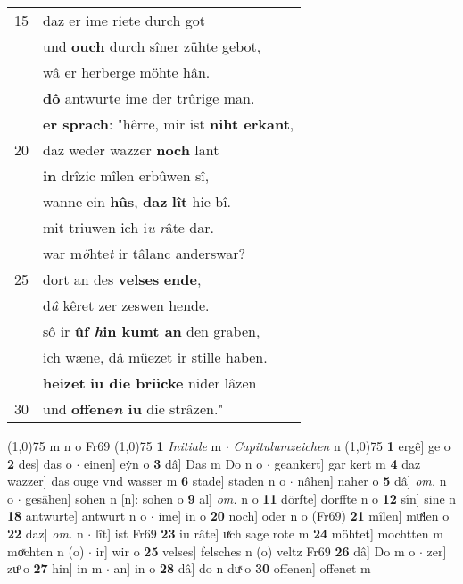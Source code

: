 \documentclass[8pt,a4paper,notitlepage]{article}
\begin{document}
\begin{table}[ht]
\begin{minipage}[t]{0.5\linewidth}
\begin{tabular}{rl}
15 & daz er ime riete durch got\\ 
 & und \textbf{ouch} durch sîner zühte gebot,\\ 
 & wâ er herberge möhte hân.\\ 
 & \textbf{dô} antwurte ime der trûrige man.\\ 
 & \textbf{er sprach}: "hêrre, mir ist \textbf{niht erkant},\\ 
20 & daz weder wazzer \textbf{noch} lant\\ 
 & \textbf{in} drîzic mîlen erbûwen sî,\\ 
 & wanne ein \textbf{hûs}, \textbf{daz} \textbf{lît} hie bî.\\ 
 & mit triuwen ich i\textit{u} \textit{r}âte dar.\\ 
 & war m\textit{ö}hte\textit{t} ir tâlanc anderswar?\\ 
25 & dort an des \textbf{velses} \textbf{ende},\\ 
 & d\textit{â} kêret zer zeswen hende.\\ 
 & sô ir \textbf{ûf \textit{h}in kumt an} den graben,\\ 
 & ich wæne, dâ müezet ir stille haben.\\ 
 & \textbf{heizet} \textbf{iu die brücke} nider lâzen\\ 
30 & und \textbf{offene\textit{n} iu} die strâzen."\\ 
\end{tabular}
\scriptsize
\line(1,0){75} \newline
m n o Fr69 \newline
\line(1,0){75} \newline
\textbf{1} \textit{Initiale} m   $\cdot$ \textit{Capitulumzeichen} n  \newline
\line(1,0){75} \newline
\textbf{1} ergê] ge o \textbf{2} des] das o  $\cdot$ einen] eẏn o \textbf{3} dâ] Das m Do n o  $\cdot$ geankert] gar kert m \textbf{4} daz wazzer] das ouge vnd wasser m \textbf{6} stade] staden n o  $\cdot$ nâhen] naher o \textbf{5} dâ] \textit{om.} n o  $\cdot$ gesâhen] sohen n [n]: sohen o \textbf{9} al] \textit{om.} n o \textbf{11} dörfte] dorffte n o \textbf{12} sîn] sine n \textbf{18} antwurte] antwurt n o  $\cdot$ ime] in o \textbf{20} noch] oder n o (Fr69) \textbf{21} mîlen] muͯlen o \textbf{22} daz] \textit{om.} n  $\cdot$ lît] ist Fr69 \textbf{23} iu râte] uͯch sage rote m \textbf{24} möhtet] mochtten m moͯchten n (o)  $\cdot$ ir] wir o \textbf{25} velses] felsches n (o) veltz Fr69 \textbf{26} dâ] Do m o  $\cdot$ zer] zuͦ o \textbf{27} hin] in m  $\cdot$ an] in o \textbf{28} dâ] do n duͯ o \textbf{30} offenen] offenet m \newline
\end{minipage}
\end{table}
\end{document}
